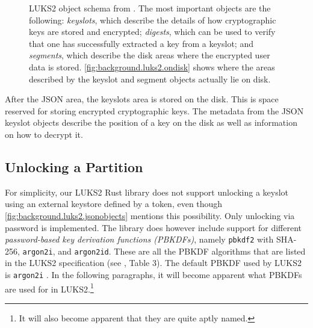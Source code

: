 \begin{figure}[htb!]
	\center
	\caption[
		LUKS2 object schema
	]{
		LUKS2 object schema from \cite{Broz2018}. The most important objects are the following: \emph{keyslots}, which describe the details of how cryptographic keys are stored and encrypted; \emph{digests}, which can be used to verify that one has successfully extracted a key from a keyslot; and \emph{segments}, which describe the disk areas where the encrypted user data is stored. \autoref{fig:background.luks2.ondisk} shows where the areas described by the keyslot and segment objects actually lie on disk.
	}
	\label{fig:background.luks2.jsonobjects}
\end{figure}

After the JSON area, the keyslots area is stored on the disk. This is space reserved for storing encrypted cryptographic keys. The metadata from the JSON keyslot objects describe the position of a key on the disk as well as information on how to decrypt it. 

\subsection{Unlocking a Partition}
\label{chap:background.luks2.unlocking}
For simplicity, our LUKS2 Rust library does not support unlocking a keyslot using an external keystore defined by a token, even though \autoref{fig:background.luks2.jsonobjects} mentions this possibility. Only unlocking via password is implemented. The library does however include support for different \emph{password-based key derivation functions (PBKDFs)}, namely \texttt{pbkdf2} with SHA-256, \texttt{argon2i}, and \texttt{argon2id}. These are all the PBKDF algorithms that are listed in the LUKS2 specification (see \cite{Broz2018}, Table 3). The default PBKDF used by LUKS2 is \texttt{argon2i} \cite{Cryptsetup2020}. In the following paragraphs, it will become apparent what PBKDFs are used for in LUKS2.\footnote{\label{fn:background.luks2.pbkdfs} It will also become apparent that they are quite aptly named.}

